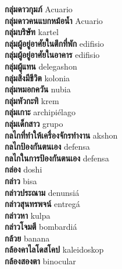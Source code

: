 \textbf{ กลุ่มดาวกุมภ์  } Acuario \\
\textbf{ กลุ่มดาวคนแบกหม้อน้ำ  } Acuario \\
\textbf{ กลุ่มบริษัท  } kartel \\
\textbf{ กลุ่มผู้อยู่อาศัยในตึกที่พัก  } edifisio \\
\textbf{ กลุ่มผู้อยู่อาศัยในอาคาร  } edifisio \\
\textbf{ กลุ่มผู้แทน  } delegashon \\
\textbf{ กลุ่มสิ่งมีชีวิต  } kolonia \\
\textbf{ กลุ่มหมอกควัน  } nubia \\
\textbf{ กลุ่มหัวกะทิ  } krem \\
\textbf{ กลุ่มเกาะ  } archipiélago \\
\textbf{ กลุ่มเด็กสาว  } grupo \\
\textbf{ กลไกที่ทำให้เครื่องจักรทำงาน  } akshon \\
\textbf{ กลไกป้องกันตนเอง  } defensa \\
\textbf{ กลไกในการป้องกันตนเอง  } defensa \\
\textbf{ กล่อง  } doshi \\
\textbf{ กล่าว  } bisa \\
\textbf{ กล่าวประณาม  } denunsiá \\
\textbf{ กล่าวสุนทรพจน์  } entregá \\
\textbf{ กล่าวหา  } kulpa \\
\textbf{ กล่าวโจมตี  } bombardiá \\
\textbf{ กล้วย  } banana \\
\textbf{ กล้องคาไลโดสโคป  } kaleidoskop \\
\textbf{ กล้องสองตา  } binocular \\
